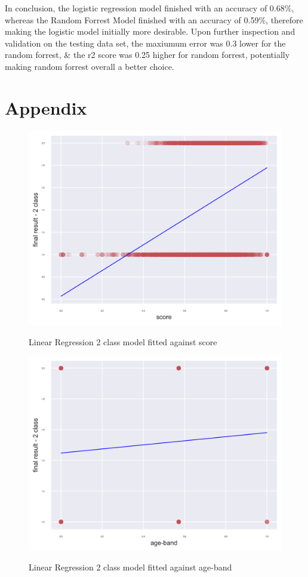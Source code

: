 \documentclass[11pt, a4paper, twocolumn]{article}
\begin{document}
In conclusion, the logistic regression model finished with an accuracy of 0.68\%, whereas the Random Forrest Model finished with an accuracy of 0.59\%, therefore making the logistic model initially more desirable.
Upon further inspection and validation on the testing data set, the maxiumum error was 0.3 lower for the random forrest, \& the r2 score was 0.25 higher for random forrest, potentially making random forrest overall a better choice.

\section*{Appendix}

\begin{figure}[h]
	\includegraphics[width=0.99\linewidth]{LinearRegression_2_class_model_against_score.png} 
	\label{fig:LinScore}
	\caption{Linear Regression 2 class model fitted against score}
\end{figure}
\centering
\begin{figure}[h]
	\includegraphics[width=0.99\linewidth]{LinearRegression_2_class_model_against_age-band.png} 
	\label{fig:LinAge}
	\caption{Linear Regression 2 class model fitted against age-band}
\end{figure}
\end{document}
